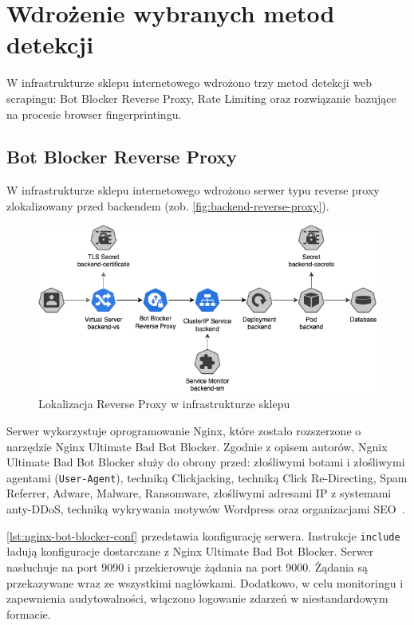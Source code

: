 \newpage


\section{Wdrożenie wybranych metod detekcji}\label{sec:wdrozenie-metod-detekcji}

W infrastrukturze sklepu internetowego wdrożono trzy metod detekcji web scrapingu: Bot Blocker Reverse Proxy, Rate Limiting oraz rozwiązanie bazujące na procesie browser fingerprintingu.

\subsection{Bot Blocker Reverse Proxy}\label{subsec:reverse-proxy-impl}

W infrastrukturze sklepu internetowego wdrożono serwer typu reverse proxy zlokalizowany przed backendem (zob. \autoref{fig:backend-reverse-proxy}).

\begin{figure}[H]
    \centering
    \captionsetup{width=.8\linewidth}
    \includegraphics[width=\textwidth]{img/backend-reverse-proxy}
    \caption{Lokalizacja Reverse Proxy w infrastrukturze sklepu}
    \label{fig:backend-reverse-proxy}
\end{figure}

Serwer wykorzystuje oprogramowanie Nginx, które zostało rozszerzone o narzędzie Nginx Ultimate Bad Bot Blocker.
Zgodnie z opisem autorów, Ngnix Ultimate Bad Bot Blocker służy do obrony przed:
złośliwymi botami i złośliwymi agentami (\texttt{User-Agent}),
techniką Clickjacking, techniką Click Re-Directing,
Spam Referrer, Adware, Malware, Ransomware,
złośliwymi adresami IP z systemami anty-DDoS,
techniką wykrywania motywów Wordpress
oraz organizacjami SEO~\cite{nginx-ultimate-bad-bot-blocker}.

\autoref{lst:nginx-bot-blocker-conf} przedstawia konfigurację serwera.
Instrukcje \texttt{include} ładują konfiguracje dostarczane z Nginx Ultimate Bad Bot Blocker.
Serwer nasłuchuje na port 9090 i przekierowuje żądania na port 9000.
Żądania są przekazywane wraz ze wszystkimi nagłówkami.
Dodatkowo, w celu monitoringu i zapewnienia audytowalności, włączono logowanie zdarzeń w niestandardowym formacie.

